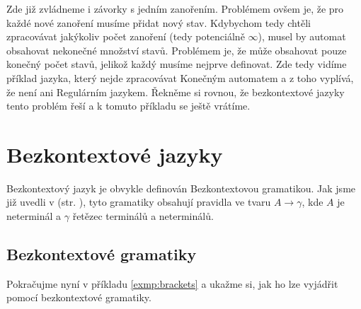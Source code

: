 \begin{exmp}
  Zde již zvládneme i závorky s jedním zanořením. Problémem ovšem je, že
  pro každé nové zanoření musíme přidat nový stav.
  Kdybychom tedy chtěli zpracovávat jakýkoliv počet zanoření (tedy potenciálně $\infty$),
  musel by automat obsahovat nekonečné množství stavů.
  Problémem  je, že může obsahovat pouze konečný
  počet stavů, jelikož každý musíme nejprve definovat.
  Zde tedy vidíme příklad jazyka, který nejde zpracovávat Konečným automatem
  a z toho vyplívá, že není ani Regulárním jazykem.
  Řekněme si rovnou, že bezkontextové jazyky tento problém řeší a k tomuto
  příkladu se ještě vrátíme.

\end{exmp}

\section{Bezkontextové jazyky}

Bezkontextový jazyk je obvykle definován Bezkontextovou gramatikou.
Jak jsme již uvedli v  (str. \pageref{subsec:chomHierarchy}),
tyto gramatiky obsahují pravidla ve tvaru $A \rightarrow \gamma$, kde $A$ je neterminál a
$\gamma$ řetězec terminálů a neterminálů.

\subsection{Bezkontextové gramatiky}
\label{subsec:contextFreeGrammars}
Pokračujme nyní v příkladu \ref{exmp:brackets} a ukažme si, jak ho lze
vyjádřit pomocí bezkontextové gramatiky.\\

